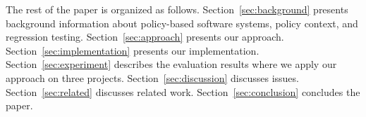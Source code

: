 The rest of the paper is organized as follows.
Section~\ref{sec:background} presents background information about
policy-based software systems, policy context, and regression testing.
Section~\ref{sec:approach} presents our approach.
Section~\ref{sec:implementation} presents our implementation. 
Section~\ref{sec:experiment} describes the evaluation results
where we apply our approach on three projects.
Section~\ref{sec:discussion} discusses issues. 
Section~\ref{sec:related} discusses related
work. Section~\ref{sec:conclusion}
concludes the paper.